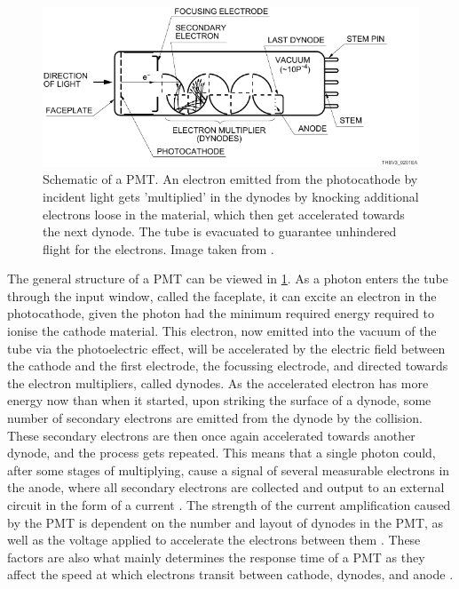 \begin{figure}[h]
	\centering
	\includegraphics[width=.8\textwidth]{pictures/photomultiplier.pdf}
	\caption{Schematic of a \acl{PMT}. An electron emitted from the photocathode by incident light gets 'multiplied' in the dynodes by knocking additional electrons loose in the material, which then get accelerated towards the next dynode. The tube is evacuated to guarantee unhindered flight for the electrons. Image taken from \cite{HAMAMATSU-PMT}.}
	\label{fig:photomultiplier}
\end{figure}


The general structure of a \acl{PMT} can be viewed in \ref{fig:photomultiplier}. As a photon enters the tube through the input window, called the faceplate, it can excite an electron in the photocathode, given the photon had the minimum required energy required to ionise the cathode material. This electron, now emitted into the vacuum of the tube via the photoelectric effect, will be accelerated by the electric field between the cathode and the first electrode, the focussing electrode, and directed towards the electron multipliers, called dynodes. As the accelerated electron has more energy now than when it started, upon striking the surface of a dynode, some number of secondary electrons are emitted from the dynode by the collision. These secondary electrons are then once again accelerated towards another dynode, and the process gets repeated. 
This means that a single photon could, after some stages of multiplying, cause a signal of several measurable electrons in the anode, where all secondary electrons are collected and output to an external circuit in the form of a current \cite{HAMAMATSU-PMT}.
The strength of the current amplification caused by the \ac{PMT} is dependent on the number and layout of dynodes in the \ac{PMT}, as well as the voltage applied to accelerate the electrons between them \cite{HAMAMATSU-PMT}. These factors are also what mainly determines the response time of a \ac{PMT} as they affect the speed at which electrons transit between cathode, dynodes, and anode \cite{HAMAMATSU-PMT}.




